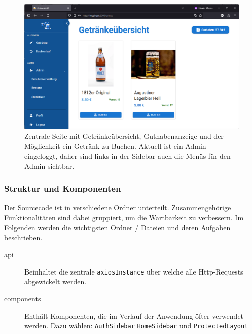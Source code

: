 \documentclass[conference,a4paper]{cs-techrep}
\begin{document}
\begin{figure}[h]
	\centering
	\includegraphics[width=1.0\linewidth]{Oberflaeche_Getraenkeuebersicht}
	\caption{Zentrale Seite mit Getränkeübersicht, Guthabenanzeige und der Möglichkeit ein Getränk zu Buchen.
	Aktuell ist ein Admin eingeloggt, daher sind links in der Sidebar auch die Menüs für den Admin sichtbar.}
	\label{fig:oberflaechegetraenkeuebersicht}
\end{figure}


\subsubsection{Struktur und Komponenten}
Der Sourcecode ist in verschiedene Ordner unterteilt. Zusammengehörige Funktionalitäten sind dabei gruppiert, um die Wartbarkeit zu verbessern. Im Folgenden werden die wichtigsten Ordner / Dateien und deren Aufgaben beschrieben.

\begin{description}
	\item[api] Beinhaltet die zentrale \texttt{axiosInstance} über welche alle Http-Requests abgewickelt werden.
	\item[components] Enthält Komponenten, die im Verlauf der Anwendung öfter verwendet werden. Dazu wählen: \texttt{AuthSidebar} \texttt{HomeSidebar} und \texttt{ProtectedLayout}
\end{description}
\end{document}
